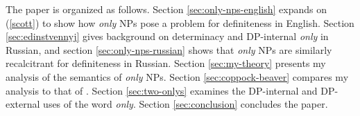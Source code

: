 The paper is organized as follows. Section \ref{sec:only-nps-english} expands on (\ref{scott}) to show how \textit{only} NPs pose a problem for definiteness in English. Section \ref{sec:edinstvennyj} gives background on determinacy and DP-internal \textit{only} in Russian, and section \ref{sec:only-nps-russian} shows that \textit{only} NPs are similarly recalcitrant for definiteness in Russian. Section \ref{sec:my-theory} presents my analysis of the semantics of \textit{only} NPs. Section \ref{sec:coppock-beaver} compares my analysis to that of \citet{cb2015}. Section \ref{sec:two-onlys} examines the DP-internal and DP-external uses of the word \textit{only}. Section \ref{sec:conclusion} concludes the paper.
